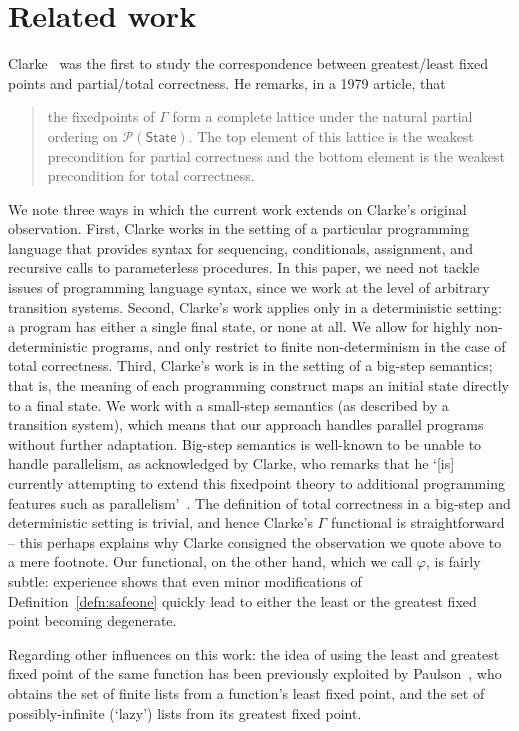 \documentclass{llncs}
\newcommand\State{\mathsf{State}}
\newcommand\SafeOne{\varphi}
\newcommand\pow{\mathcal{P}}
\begin{document}
\section{Related work}
\label{sec:related}

Clarke~\cite{clarke79} was the first to study the correspondence
between greatest/least fixed points and partial/total correctness. He
remarks, in a 1979 article, that 
%
\begin{quote}the fixedpoints of $\Gamma$ form a complete
lattice under the natural partial ordering on $\pow(\State)$. The top
element of this lattice is the weakest precondition for partial
correctness and the bottom element is the weakest precondition for
total correctness.~\cite[p.~279, footnote]{clarke79} \end{quote}
%
We note three ways in which the current work extends on Clarke's
original observation. First, Clarke works in the setting of a
particular programming language that provides syntax for sequencing,
conditionals, assignment, and recursive calls to parameterless
procedures. In this paper, we need not tackle issues of programming
language syntax, since we work at the level of arbitrary transition
systems. Second, Clarke's work applies only in a deterministic
setting: a program has either a single final state, or none at all. We
allow for highly non-deterministic programs, and only restrict to
finite non-determinism in the case of total correctness. Third,
Clarke's work is in the setting of a big-step semantics; that is, the
meaning of each programming construct maps an initial state directly
to a final state. We work with a small-step semantics (as described by
a transition system), which means that our approach handles parallel
programs without further adaptation. Big-step semantics is well-known
to be unable to handle parallelism, as acknowledged by Clarke, who
remarks that he `[is] currently attempting to extend this fixedpoint
theory to additional programming features such as
parallelism'~\cite[p.~292]{clarke79}. The definition of total
correctness in a big-step and deterministic setting is trivial, and
hence Clarke's $\Gamma$ functional is straightforward -- this perhaps
explains why Clarke consigned the observation we quote above to a mere
footnote. Our functional, on the other hand, which we call $\SafeOne$,
is fairly subtle: experience shows that even minor modifications of
Definition~\ref{defn:safeone} quickly lead to either the least or the
greatest fixed point becoming degenerate.

Regarding other influences on this work: the idea of using the least
and greatest fixed point of the same function has been previously
exploited by Paulson~\cite[\S3]{paulson97a}, who obtains the set of
finite lists from a function's least fixed point, and the set of
possibly-infinite (`lazy') lists from its greatest fixed point.
\end{document}
